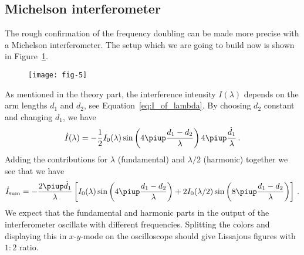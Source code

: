 \documentclass[11pt, english, fleqn, DIV=15, headinclude, BCOR=2cm]{scrreprt}
\begin{document}


\subsection{Michelson interferometer}

The rough confirmation of the frequency doubling can be made more precise with
a Michelson interferometer. The setup which we are going to build now is shown
in Figure~\ref{fig:fig-5}.


\begin{figure}
    \centering
    \texttt{[image: fig-5]}
    \caption{%
        \parencite[Figure~5]{lab-course/doubling/manual}
    }
    \label{fig:fig-5}
\end{figure}


As mentioned in the theory part, the interference intensity $I(\lambda)$
depends on the arm lengths $d_1$ and $d_2$, see
Equation~\eqref{eq:I_of_lambda}. By choosing $d_2$ constant and changing $d_1$,
we have
\[
    \dot I(\lambda) = - \frac12 I_0(\lambda) 
        \sin\del{4 \piup \frac{d_1 - d_2}{\lambda}}
        4 \piup \frac{\dot d_1}{\lambda} \,.
\]
Adding the contributions for $\lambda$ (fundamental) and $\lambda/2$ (harmonic)
together we see that we have
\[
    \dot I_\text{sum}
    =
    - \frac{2 \piup \dot d_1}{\lambda}
    \sbr{
        I_0(\lambda) 
        \sin\del{4 \piup \frac{d_1 - d_2}{\lambda}}
        +
        2 I_0(\lambda/2) 
        \sin\del{8 \piup \frac{d_1 - d_2}{\lambda}}
    } \,.
\]
We expect that the fundamental and harmonic parts in the output of the
interferometer oscillate with different frequencies. Splitting the colors and
displaying this in $x$-$y$-mode on the oscilloscope should give Lissajous
figures with $1:2$ ratio.
\end{document}
